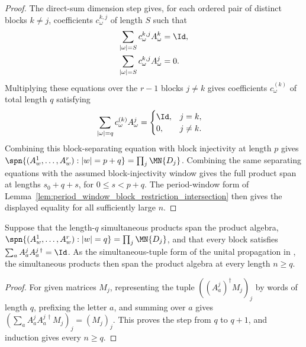 \begin{proof}
    \leanok
    The direct-sum dimension step gives, for each ordered pair of distinct
    blocks $k\ne j$, coefficients $c^{k,j}_\omega$ of length $S$ such that
    \begin{align}
        \sum_{|\omega|=S} c^{k,j}_\omega A^k_\omega
         & =\Id, \notag \\
        \sum_{|\omega|=S} c^{k,j}_\omega A^j_\omega
         & =0. \notag
    \end{align}
    Multiplying these equations over the $r-1$ blocks $j\ne k$ gives
    coefficients $c^{(k)}_\omega$ of total length $q$ satisfying
    \begin{align}
        \sum_{|\omega|=q}c^{(k)}_\omega A^j_\omega
         & =
        \begin{cases}
            \Id, & j=k,    \\
            0,   & j\ne k.
        \end{cases} \notag
    \end{align}
    Combining this block-separating equation with block injectivity at length
    $p$ gives
    $\spn\{(A^1_w,\ldots,A^r_w):|w|=p+q\} = \prod_j \MN{D_j}$.
    Combining the same separating equations with the assumed
    block-injectivity window gives the full product span at lengths $s_0+q+s$,
    for $0\le s<p+q$. The period-window form of
    Lemma~\ref{lem:period_window_block_restriction_intersection} then gives
    the displayed equality for all sufficiently large $n$.
\end{proof}

\begin{lemma}
    \label{lem:unital_simultaneous_product_span_propagation}
    \leanok
    Suppose that the length-$q$ simultaneous products span the product algebra,
    $\spn\{(A^1_w,\ldots,A^r_w):|w|=q\} = \prod_j\MN{D_j}$,
    and that every block satisfies
    $\sum_a A^j_aA^{j\,\dagger}_a=\Id$. As the
    simultaneous-tuple form of the unital propagation in
    \cite[lines~893--898]{PerezGarcia2007Matrix}, the simultaneous products
    then span the product algebra at every length $n\ge q$.
\end{lemma}

\begin{proof}
    \leanok
    For given matrices $M_j$, representing the tuple
    $((A^j_a)^\dagger M_j)_j$ by words of length $q$, prefixing the letter $a$,
    and summing over $a$ gives
    $\left(\sum_aA^j_aA^{j\,\dagger}_aM_j\right)_j =(M_j)_j$.
    This proves the step from $q$ to $q+1$, and induction gives every $n\ge q$.
\end{proof}

